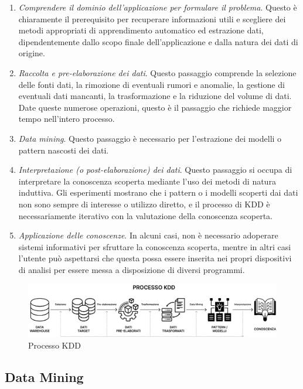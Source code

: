 \begin{enumerate}
    \item \textit{Comprendere il dominio dell'applicazione per formulare il problema}. Questo è chiaramente il prerequisito per recuperare informazioni utili e scegliere dei metodi appropriati di apprendimento automatico ed estrazione dati, dipendentemente dallo scopo finale dell'applicazione e dalla natura dei dati di origine.
    \item \textit{Raccolta e pre-elaborazione dei dati}. Questo passaggio comprende la selezione delle fonti dati, la rimozione di eventuali rumori e anomalie, la gestione di eventuali dati mancanti, la trasformazione e la riduzione del volume di dati. Date queste numerose operazioni, questo è il passaggio che richiede maggior tempo nell'intero processo.
    \item \textit{Data mining}. Questo passaggio è necessario per l'estrazione dei modelli o pattern nascosti dei dati.
    \item \textit{Interpretazione (o post-elaborazione) dei dati}. Questo passaggio si occupa di interpretare la conoscenza scoperta mediante l'uso dei metodi di natura induttiva. Gli esperimenti mostrano che i pattern o i modelli scoperti dai dati non sono sempre di interesse o utilizzo diretto, e il processo di KDD è necessariamente iterativo con la valutazione della conoscenza scoperta.
    \item \textit{Applicazione delle conoscenze}. In alcuni casi, non è necessario adoperare sistemi informativi per sfruttare la conoscenza scoperta, mentre in altri casi l'utente può aspettarsi che questa possa essere inserita nei propri dispositivi di analisi per essere messa a disposizione di diversi programmi.
\end{enumerate}

\begin{figure}[!h]
    \centering
    \includegraphics[width=1\linewidth]{figure//capitolo_3/KDD Process.pdf}
    \caption{Processo KDD}
    \label{fig:KDD Process}
\end{figure}

\subsection{Data Mining}

